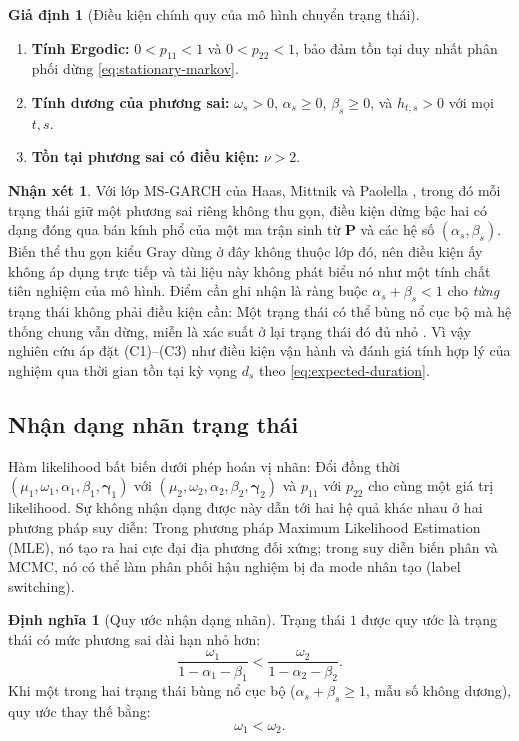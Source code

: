 \documentclass[12pt,a4paper]{article}
\numberwithin{equation}{section}
\theoremstyle{definition}
\newtheorem{definition}{Định nghĩa}[section]
\newtheorem{assumption}{Giả định}[section]
\newtheorem{remark}{Nhận xét}[section]
\newcommand{\Pmat}{\symbf{P}}
\newcommand{\bmgamma}{\symbf{\gamma}}
\begin{document}
	\begin{assumption}[Điều kiện chính quy của mô hình chuyển trạng thái]\label{as:ms}
		\leavevmode
		\begin{enumerate}
			\item[(C1)] \textbf{Tính Ergodic:} $0<p_{11}<1$ và $0<p_{22}<1$, bảo đảm tồn tại duy
			nhất phân phối dừng \eqref{eq:stationary-markov}.
			\item[(C2)] \textbf{Tính dương của phương sai:} $\omega_s>0$, $\alpha_s\ge 0$,
			$\beta_s\ge 0$, và $h_{t,s}>0$ với mọi $t,s$.
			\item[(C3)] \textbf{Tồn tại phương sai có điều kiện:} $\nu>2$.
		\end{enumerate}
	\end{assumption}
	
	\begin{remark}
		Với lớp MS-GARCH của Haas, Mittnik và Paolella \cite{haas2004}, trong đó mỗi trạng thái
		giữ một phương sai riêng không thu gọn, điều kiện dừng bậc hai có dạng đóng qua bán kính
		phổ của một ma trận sinh từ $\Pmat$ và các hệ số $(\alpha_s,\beta_s)$. Biến thể thu gọn
		kiểu Gray dùng ở đây không thuộc lớp đó, nên điều kiện ấy không áp dụng trực tiếp
		và tài liệu này không phát biểu nó như một tính chất tiên nghiệm của mô hình. Điểm cần ghi nhận là
		ràng buộc $\alpha_s+\beta_s<1$ cho \emph{từng} trạng thái không phải điều kiện cần: Một
		trạng thái có thể bùng nổ cục bộ mà hệ thống chung vẫn dừng, miễn là xác suất ở lại trạng thái đó
		đủ nhỏ \cite{francq2001}. Vì vậy nghiên cứu áp đặt (C1)--(C3) như điều kiện vận hành và
		đánh giá tính hợp lý của nghiệm qua thời gian tồn tại kỳ vọng $d_s$ theo \eqref{eq:expected-duration}.
	\end{remark}
	
	\subsection{Nhận dạng nhãn trạng thái}\label{subsec:identification}
	Hàm likelihood bất biến dưới phép hoán vị nhãn: Đổi đồng thời
	$(\mu_1,\omega_1,\alpha_1,\beta_1,\bmgamma_1)$ với
	$(\mu_2,\omega_2,\alpha_2,\beta_2,\bmgamma_2)$ và $p_{11}$ với $p_{22}$ cho cùng một giá
	trị likelihood. Sự không nhận dạng được này dẫn tới hai hệ quả khác nhau ở hai phương pháp
	suy diễn: Trong phương pháp Maximum Likelihood Estimation (MLE), nó tạo ra hai cực đại địa phương đối xứng; trong suy diễn
	biến phân và MCMC, nó có thể làm phân phối hậu nghiệm bị đa mode nhân tạo (label
	switching).
	
	\begin{definition}[Quy ước nhận dạng nhãn]\label{def:label}
		Trạng thái $1$ được quy ước là trạng thái có mức phương sai dài hạn nhỏ hơn:
		\begin{equation}
			\frac{\omega_1}{1-\alpha_1-\beta_1} < \frac{\omega_2}{1-\alpha_2-\beta_2}.
			\label{eq:label-convention}
		\end{equation}
		Khi một trong hai trạng thái bùng nổ cục bộ ($\alpha_s+\beta_s\ge1$, mẫu số không dương),
		quy ước thay thế bằng:
		\begin{equation}
			\omega_1 < \omega_2.
			\label{eq:label-convention-alt}
		\end{equation}
	\end{definition}
	
\end{document}

